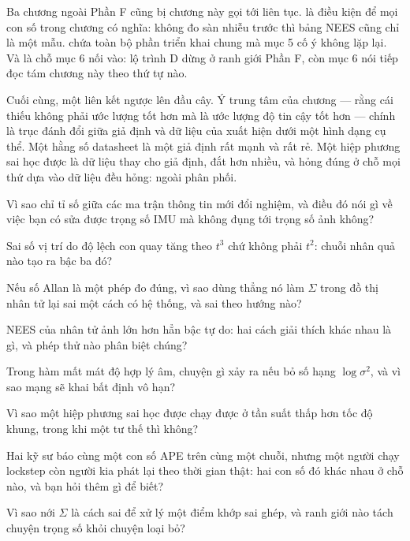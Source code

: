\documentclass[../../deep_learning.tex]{subfiles}
\begin{document}
Ba chương ngoài Phần F cũng bị chương này gọi tới liên tục.  là điều kiện để mọi con số trong chương có nghĩa: không đo sàn nhiễu trước thì bảng NEES cũng chỉ là một mẫu.  chứa toàn bộ phần triển khai chung mà mục 5 cố ý không lặp lại. Và  là chỗ mục 6 nối vào: lộ trình D dừng ở ranh giới Phần F, còn mục 6 nói tiếp đọc tám chương này theo thứ tự nào.

Cuối cùng, một liên kết ngược lên đầu cây. Ý trung tâm của chương --- rằng cái thiếu không phải ước lượng tốt hơn mà là ước lượng độ tin cậy tốt hơn --- chính là trục đánh đổi giữa giả định và dữ liệu của  xuất hiện dưới một hình dạng cụ thể. Một hằng số datasheet là một giả định rất mạnh và rất rẻ. Một hiệp phương sai học được là dữ liệu thay cho giả định, đắt hơn nhiều, và hỏng đúng ở chỗ mọi thứ dựa vào dữ liệu đều hỏng: ngoài phân phối.

\begin{tukiem}
\item Vì sao chỉ tỉ số giữa các ma trận thông tin mới đổi nghiệm, và điều đó nói gì về việc bạn có sửa được trọng số IMU mà không đụng tới trọng số ảnh không?
\item Sai số vị trí do độ lệch con quay tăng theo \(t^3\) chứ không phải \(t^2\): chuỗi nhân quả nào tạo ra bậc ba đó?
\item Nếu số Allan là một phép đo đúng, vì sao dùng thẳng nó làm \(\Sigma\) trong đồ thị nhân tử lại sai một cách có hệ thống, và sai theo hướng nào?
\item NEES của nhân tử ảnh lớn hơn hẳn bậc tự do: hai cách giải thích khác nhau là gì, và phép thử nào phân biệt chúng?
\item Trong hàm mất mát độ hợp lý âm, chuyện gì xảy ra nếu bỏ số hạng \(\log\sigma^2\), và vì sao mạng sẽ khai bất định vô hạn?
\item Vì sao một hiệp phương sai học được chạy được ở tần suất thấp hơn tốc độ khung, trong khi một tư thế thì không?
\item Hai kỹ sư báo cùng một con số APE trên cùng một chuỗi, nhưng một người chạy lockstep còn người kia phát lại theo thời gian thật: hai con số đó khác nhau ở chỗ nào, và bạn hỏi thêm gì để biết?
\item Vì sao nới \(\Sigma\) là cách sai để xử lý một điểm khớp sai ghép, và ranh giới nào tách chuyện trọng số khỏi chuyện loại bỏ?
\end{tukiem}
\ifSubfilesClassLoaded{\printbibliography[title={Nguồn}]}{}
\end{document}
